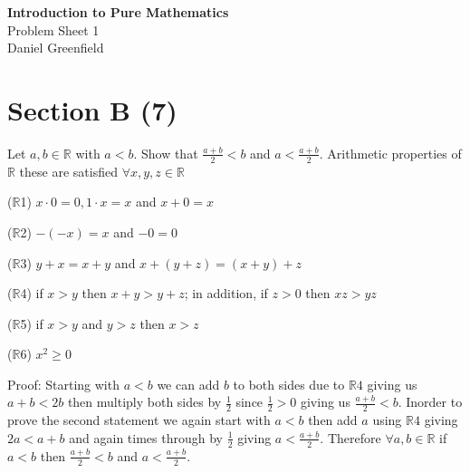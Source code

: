 \documentclass[11pt,a4paper]{article}
\newcommand{\modulename}{Introduction to Pure Mathematics}
\newcommand{\sheetnumber}{1}
\newcommand{\myname}{Daniel Greenfield}
\newcommand{\R}{\mathbb{R}}
\begin{document}
\begin{center}
  {\Large \textbf{\modulename}}\\[0.3em]
  {\large Problem Sheet \sheetnumber}\\[0.3em]
  \myname
  \section*{Section B (7)}
          Let $a, b \in \R $ with $a < b$. Show that $\frac{a + b}{2} < b$ and $a < \frac{a + b}{2}$.
        Arithmetic properties of $\R$ these are satisfied $\forall x,y,z \in \R$

        ($\R$1) $x \cdot 0 = 0, 1 \cdot x = x$ and $x + 0 = x$

        ($\R$2) $- (-x) = x $ and $ -0 = 0$ 

        ($\R$3) $y + x = x + y$ and $x + ( y + z) = (x + y) + z$

        ($\R$4) if $x > y$ then $x + y > y + z$; in addition, if $ z > 0$ then $xz  > yz$

        ($\R$5) if $ x > y$ and $y > z$ then $x > z$

        ($\R$6) $x^2 \geq 0$

        Proof:
        Starting with $a < b$ we can add $b$ to both sides due to $\R4$ giving us $a + b < 2b$ then multiply both sides by $\frac{1}{2}$ since $\frac{1}{2} > 0$ giving us $\frac{a + b}{2} < b$. Inorder to prove the second statement we again start with $a < b$ then add $a$ using $\R 4$ giving $2a < a + b$ and again times through by $\frac{1}{2}$ giving $a < \frac{a+b}{2}$. Therefore $\forall a,b \in \R $ if $a < b$ then $\frac{a+b}{2} < b$ and $a < \frac{a+b}{2}$.


    
\end{center}
\end{document}
